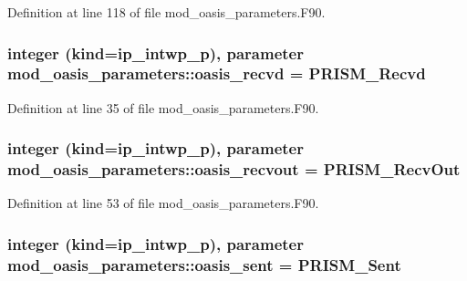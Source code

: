 Definition at line 118 of file mod\+\_\+oasis\+\_\+parameters.\+F90.

\hypertarget{classmod__oasis__parameters_a50fc92036d81ca0ea23918e1feddfe75}{
\subsubsection[{oasis\+\_\+recvd}]{\setlength{\rightskip}{0pt plus 5cm}integer (kind=ip\+\_\+intwp\+\_\+p), parameter mod\+\_\+oasis\+\_\+parameters\+::oasis\+\_\+recvd = P\+R\+I\+S\+M\+\_\+\+Recvd}}\label{classmod__oasis__parameters_a50fc92036d81ca0ea23918e1feddfe75}


Definition at line 35 of file mod\+\_\+oasis\+\_\+parameters.\+F90.

\hypertarget{classmod__oasis__parameters_ac7406e7f558491599acfbb6f4628f811}{
\subsubsection[{oasis\+\_\+recvout}]{\setlength{\rightskip}{0pt plus 5cm}integer (kind=ip\+\_\+intwp\+\_\+p), parameter mod\+\_\+oasis\+\_\+parameters\+::oasis\+\_\+recvout = P\+R\+I\+S\+M\+\_\+\+Recv\+Out}}\label{classmod__oasis__parameters_ac7406e7f558491599acfbb6f4628f811}


Definition at line 53 of file mod\+\_\+oasis\+\_\+parameters.\+F90.

\hypertarget{classmod__oasis__parameters_af739945ec2da833423cdc6e220e1c847}{
\subsubsection[{oasis\+\_\+sent}]{\setlength{\rightskip}{0pt plus 5cm}integer (kind=ip\+\_\+intwp\+\_\+p), parameter mod\+\_\+oasis\+\_\+parameters\+::oasis\+\_\+sent = P\+R\+I\+S\+M\+\_\+\+Sent}}\label{classmod__oasis__parameters_af739945ec2da833423cdc6e220e1c847}


